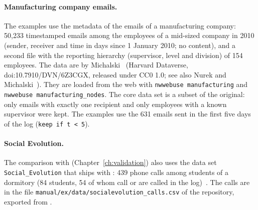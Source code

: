 \paragraph{Manufacturing company emails.} The examples use the metadata of the emails of a manufacturing company: 50,233 timestamped emails among the employees of a mid-sized company in 2010 (sender, receiver and time in days since 1 January 2010; no content), and a second file with the reporting hierarchy (supervisor, level and division) of 154 employees. The data are by Michalski~\cite{michalski2020} (Harvard Dataverse, doi:10.7910/DVN/6Z3CGX, released under CC0 1.0; see also Nurek and Michalski~\cite{nurek2020}). They are loaded from the web with \texttt{nwwebuse manufacturing} and \texttt{nwwebuse manufacturing\_nodes}. The core data set is a subset of the original: only emails with exactly one recipient and only employees with a known supervisor were kept. The examples use the 631 emails sent in the first five days of the log (\texttt{keep if t < 5}).

\paragraph{Social Evolution.} The comparison with \goldfish{} (Chapter~\ref{ch:validation}) also uses the data set \texttt{Social\_Evolution} that ships with \goldfish{}: 439 phone calls among students of a dormitory (84 students, 54 of whom call or are called in the log)~\cite{madan2012}. The calls are in the file \texttt{manual/ex/data/socialevolution\_calls.csv} of the repository, exported from \goldfish{}.
